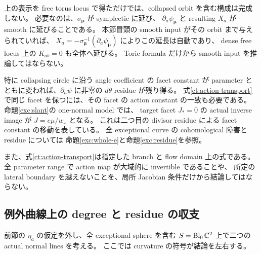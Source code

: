 \begin{remark}
\label{ct:collapsed}
上の表示を free torus locus で得ただけでは、collapsed orbit を含む構成は完成しない。
必要なのは、$\sigma_{\boldsymbol\mu}$ が symplectic に延び、
$\partial_a\psi_{\boldsymbol\mu}$ と resulting $X_a$ が smooth に延びることである。
本節冒頭の smooth input がその orbit まで与えられていれば、
$X_a=-\sigma_{\boldsymbol\mu}^{-1}(\partial_a\psi_{\boldsymbol\mu})$ によりこの延長は自動であり、
dense free locus 上の $K_{ab}=0$ も全体へ延びる。
Toric formula だけから smooth input を推論してはならない。

特に collapsing circle に沿う angle coefficient の facet constant が
parameter とともに変われば、$\partial_a\psi$ に非零の $d\theta$ residue が残り得る。
式\eqref{ct:action-transport}で同じ facet を保つには、その facet の action constant の一致も必要である。
命題\ref{exc:slant}の one-normal model では、
target facet $J_*=0$ の actual inverse image が $J=e\mu/w_x$ となる。
これは二つ目の divisor residue による facet constant の移動を表している。
全 exceptional curve の cohomological 障害と residue については
命題\ref{exc:whole-e}と命題\ref{exc:residue}を参照。

また、式\eqref{ct:action-transport}は指定した branch と flow domain 上の式である。
全 parameter range で action map が大域的に invertible であることや、
所定の lateral boundary を越えないことを、局所 Jacobian 条件だけから結論してはならない。
\end{remark}

\subsection{例外曲線上の degree と residue の収支}
\label{ct:degree-section}

前節の $\eta_a$ の仮定を外し、全 exceptional sphere を含む
$S=\operatorname{Bl}_0\mathbb C^2$ 上で二つの actual normal lines を考える。
ここでは curvature の符号が結論を左右する。

